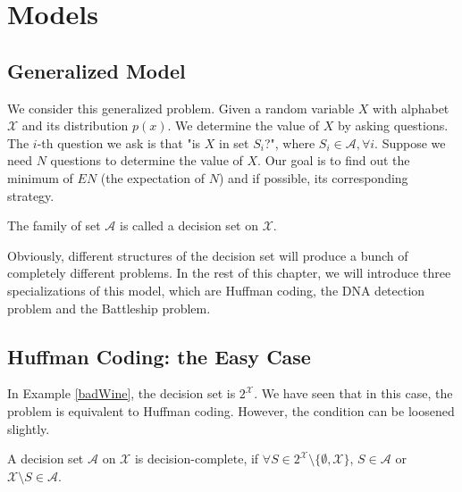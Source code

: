 \section{Models}
\subsection{Generalized Model}

We consider this generalized problem. Given a random variable $X$ with alphabet $\mathcal{X}$ and its distribution $p(x)$. We determine the value of $X$ by asking questions. The $i$-th question we ask is that "is $X$ in set $S_i$?", where $S_i \in \mathscr{A}, \forall i$. Suppose we need $N$ questions to determine the value of $X$. Our goal is to find out the minimum of $EN$ (the expectation of $N$) and if possible, its corresponding strategy.

\begin{definition}

The family of set $\mathscr{A}$ is called a decision set on $\mathcal{X}$.

\end{definition}

Obviously, different structures of the decision set will produce a bunch of completely different problems. In the rest of this chapter, we will introduce three specializations of this model, which are Huffman coding, the DNA detection problem and the Battleship problem.

\subsection{Huffman Coding: the Easy Case}

In Example \ref{badWine}, the decision set is $2^\mathcal{X}$. We have seen that in this case, the problem is equivalent to Huffman coding. However, the condition can be loosened slightly.

\begin{definition}

A decision set $\mathscr{A}$ on $\mathcal{X}$ is  decision-complete, if $\forall S\in 2^\mathcal{X} \setminus \{\emptyset, \mathcal{X}\}$, $S \in \mathscr{A} $ or $\mathcal{X} \setminus S \in \mathscr{A}$.

\end{definition}

